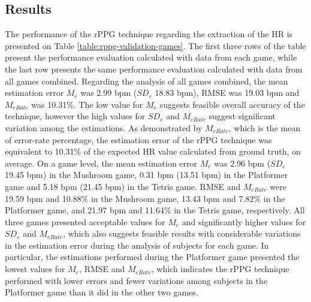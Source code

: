 \subsection{Results}
The performance of the rPPG technique regarding the extraction of the HR is presented on Table \ref{table:rppg-validation-games}. The first three rows of the table present the performance evaluation calculated with data from each game, while the last row presents the same performance evaluation calculated with data from all games combined. Regarding the analysis of all games combined, the mean estimation error $M_e$ was 2.99 bpm ($SD_e$ 18.83 bpm), RMSE was 19.03 bpm and $M_{eRate}$ was 10.31\%. The low value for $M_e$ suggests feasible overall accuracy of the technique, however the high values for $SD_e$ and $M_{eRate}$ suggest significant variation among the estimations. As demonstrated by $M_{eRate}$, which is the mean of error-rate percentage, the estimation error of the rPPG technique was equivalent to 10.31\% of the expected HR value calculated from ground truth, on average. On a game level, the mean estimation error $M_e$ was 2.96 bpm ($SD_e$ 19.45 bpm) in the Mushroom game, 0.31 bpm (13.51 bpm) in the Platformer game and 5.18 bpm (21.45 bpm) in the Tetris game. RMSE and $M_{eRate}$ were 19.59 bpm and 10.88\% in the Mushroom game, 13.43 bpm and 7.82\% in the Platformer game, and 21.97 bpm and 11.64\% in the Tetris game, respectively. All three games presented acceptable values for $M_e$ and significantly higher values for $SD_e$ and $M_{eRate}$, which also suggests feasible results with considerable variations in the estimation error during the analysis of subjects for each game. In particular, the estimations performed during the Platformer game presented the lowest values for $M_e$, RMSE and $M_{eRate}$, which indicates the rPPG technique performed with lower errors and fewer variations among subjects in the Platformer game than it did in the other two games.

\begin{table}
\label{table:rppg-validation-games}
\end{table}

